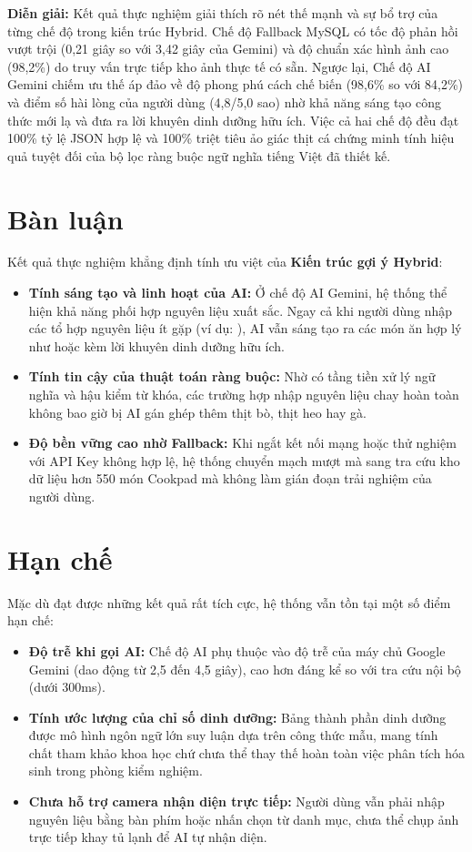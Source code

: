 \noindent\textbf{Diễn giải:} Kết quả thực nghiệm giải thích rõ nét thế mạnh và sự bổ trợ của từng chế độ trong kiến trúc Hybrid. Chế độ Fallback MySQL có tốc độ phản hồi vượt trội (0,21 giây so với 3,42 giây của Gemini) và độ chuẩn xác hình ảnh cao (98,2\%) do truy vấn trực tiếp kho ảnh thực tế có sẵn. Ngược lại, Chế độ AI Gemini chiếm ưu thế áp đảo về độ phong phú cách chế biến (98,6\% so với 84,2\%) và điểm số hài lòng của người dùng (4,8/5,0 sao) nhờ khả năng sáng tạo công thức mới lạ và đưa ra lời khuyên dinh dưỡng hữu ích. Việc cả hai chế độ đều đạt 100\% tỷ lệ JSON hợp lệ và 100\% triệt tiêu ảo giác thịt cá chứng minh tính hiệu quả tuyệt đối của bộ lọc ràng buộc ngữ nghĩa tiếng Việt đã thiết kế.

\section{Bàn luận}

Kết quả thực nghiệm khẳng định tính ưu việt của \textbf{Kiến trúc gợi ý Hybrid}:
\begin{itemize}[leftmargin=1.6em, itemsep=2pt]
  \item \textbf{Tính sáng tạo và linh hoạt của AI:} Ở chế độ AI Gemini, hệ thống thể hiện khả năng phối hợp nguyên liệu xuất sắc. Ngay cả khi người dùng nhập các tổ hợp nguyên liệu ít gặp (ví dụ: ), AI vẫn sáng tạo ra các món ăn hợp lý như  hoặc  kèm lời khuyên dinh dưỡng hữu ích.
  \item \textbf{Tính tin cậy của thuật toán ràng buộc:} Nhờ có tầng tiền xử lý ngữ nghĩa và hậu kiểm từ khóa, các trường hợp nhập nguyên liệu chay hoàn toàn không bao giờ bị AI gán ghép thêm thịt bò, thịt heo hay gà.
  \item \textbf{Độ bền vững cao nhờ Fallback:} Khi ngắt kết nối mạng hoặc thử nghiệm với API Key không hợp lệ, hệ thống chuyển mạch mượt mà sang tra cứu kho dữ liệu hơn 550 món Cookpad mà không làm gián đoạn trải nghiệm của người dùng.
\end{itemize}

\section{Hạn chế}

Mặc dù đạt được những kết quả rất tích cực, hệ thống vẫn tồn tại một số điểm hạn chế:
\begin{itemize}[leftmargin=1.6em, itemsep=2pt]
  \item \textbf{Độ trễ khi gọi AI:} Chế độ AI phụ thuộc vào độ trễ của máy chủ Google Gemini (dao động từ 2,5 đến 4,5 giây), cao hơn đáng kể so với tra cứu nội bộ (dưới 300ms).
  \item \textbf{Tính ước lượng của chỉ số dinh dưỡng:} Bảng thành phần dinh dưỡng được mô hình ngôn ngữ lớn suy luận dựa trên công thức mẫu, mang tính chất tham khảo khoa học chứ chưa thể thay thế hoàn toàn việc phân tích hóa sinh trong phòng kiểm nghiệm.
  \item \textbf{Chưa hỗ trợ camera nhận diện trực tiếp:} Người dùng vẫn phải nhập nguyên liệu bằng bàn phím hoặc nhấn chọn từ danh mục, chưa thể chụp ảnh trực tiếp khay tủ lạnh để AI tự nhận diện.
\end{itemize}
